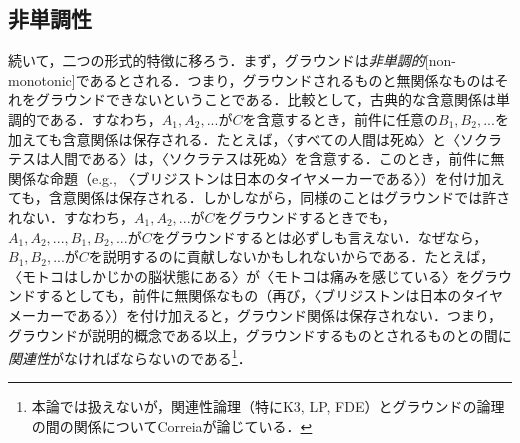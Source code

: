 \documentclass[twoside,14Q,dvipdfmx]{jsarticle}
\theoremstyle{definition}
\begin{document}
\subsection{非単調性}\label{nonmonotonic}
続いて，二つの形式的特徴に移ろう．まず，グラウンドは\emph{非単調的}[non-monotonic]であるとされる．つまり，グラウンドされるものと無関係なものはそれをグラウンドできないということである．比較として，古典的な含意関係は単調的である．すなわち，$A_1 ,A_2 ,...$が$C$を含意するとき，前件に任意の$B_1 ,B_2 ,...$を加えても含意関係は保存される．たとえば，〈すべての人間は死ぬ〉と〈ソクラテスは人間である〉は，〈ソクラテスは死ぬ〉を含意する．このとき，前件に無関係な命題（e.g., 〈ブリジストンは日本のタイヤメーカーである〉）を付け加えても，含意関係は保存される．しかしながら，同様のことはグラウンドでは許されない．すなわち，$A_1 ,A_2 ,...$が$C$をグラウンドするときでも，$A_1 ,A_2 ,...,B_1 ,B_2 ,...$が$C$をグラウンドするとは必ずしも言えない．なぜなら，$B_1 ,B_2 ,...$が$C$を説明するのに貢献しないかもしれないからである．たとえば，〈モトコはしかじかの脳状態にある〉が〈モトコは痛みを感じている〉をグラウンドするとしても，前件に無関係なもの（再び，〈ブリジストンは日本のタイヤメーカーである〉）を付け加えると，グラウンド関係は保存されない．つまり，グラウンドが説明的概念である以上，グラウンドするものとされるものとの間に\emph{関連性}がなければならないのである\footnote{本論では扱えないが，関連性論理（特にK3, LP, FDE）とグラウンドの論理の間の関係についてCorreia\cite[pp.42--3]{Correia2014}が論じている．}．
\end{document}
